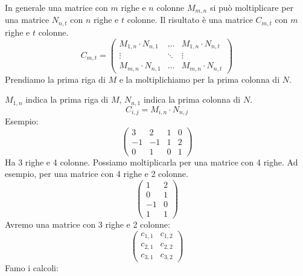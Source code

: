 In generale una matrice con $m$ righe e $n$ colonne $M_{m,n}$ si pu\`o moltiplicare per una matrice $N_{n,t}$ con $n$ righe e $t$ colonne. Il risultato \`e una matrice $C_{m,t}$ con $m$ righe e $t$ colonne.
\[
C_{m, t} =
\begin{pmatrix}
M_{1, n} \cdot N_{n, 1} & \dots & M_{1, n} \cdot N_{n, t} \\
\vdots & \ddots & \vdots \\
M_{m, n} \cdot N_{n, 1} & \dots & M_{m, n} \cdot N_{n, t}
\end{pmatrix}
\]
Prendiamo la prima riga di $M$ e la moltiplichiamo per la prima colonna di $N$.

$M_{1,n}$ indica la prima riga di $M$, $N_{n,1}$ indica la prima colonna di $N$.
\[
C_{i,j} = M_{i,n} \cdot N_{n,j}
\]
Esempio:
\[
\begin{pmatrix}
3 & 2 & 1 & 0 \\
-1 & -1 & 1 & 2 \\
0 & 1 & 0 & 1
\end{pmatrix}
\]
Ha 3 righe e 4 colonne. Possiamo moltiplicarla per una matrice con 4 righe. Ad esempio, per una matrice con 4 righe e 2 colonne.
\[
\begin{pmatrix}
1 & 2 \\
0 & 1 \\
-1 & 0 \\
1 & 1
\end{pmatrix}
\]
Avremo una matrice con 3 righe e 2 colonne:
\[
\begin{pmatrix}
c_{1,1} & c_{1,2} \\
c_{2,1} & c_{2,2} \\
c_{3,1} & c_{3,2}
\end{pmatrix}
\]
Famo i calcoli:
